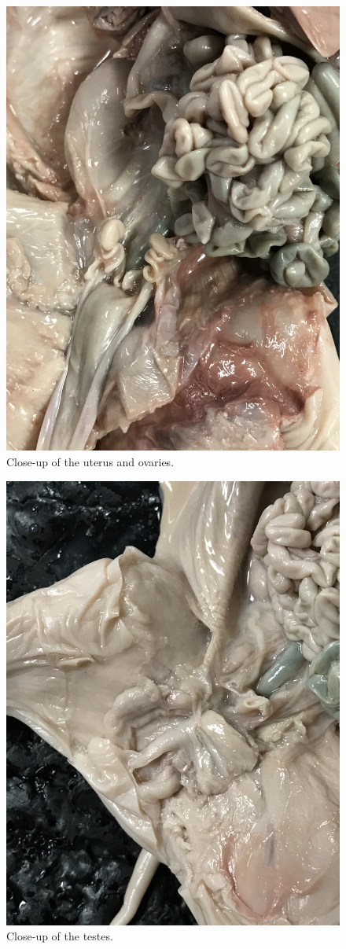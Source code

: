 \begin{figure}

{\centering \includegraphics[width=0.7\linewidth]{./figures/pig/pig_uterus} 

}

\caption{Close-up of the uterus and ovaries.}\label{fig:female}
\end{figure}

\begin{figure}

{\centering \includegraphics[width=0.7\linewidth]{./figures/pig/pig_testes} 

}

\caption{Close-up of the testes.}\label{fig:male}
\end{figure}

